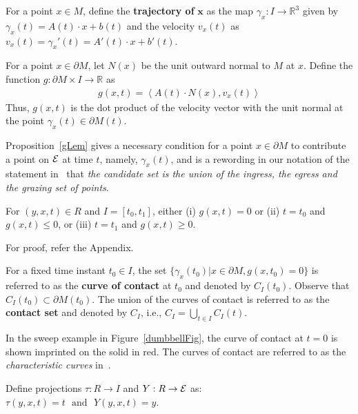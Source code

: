 \documentclass{elsart5p}
\begin{document}
\begin{defn} \label{trajXDef}
For a point $x \in M$, define the {\bf trajectory of} $\pmb{x}$ as the map $\gamma_x : I \to \mathbb{R}^3$ 
given by $\gamma_x(t) = A(t) \cdot x + b(t)$ and the velocity $v_x(t)$ as 
$v_x(t) = \gamma_x'(t) = A'(t) \cdot x + b'(t)$.
\end{defn}

For a point $x \in \partial M$, let $N(x)$ be the unit outward normal to $M$ at $x$.  Define the function 
$g: \partial M \times I \to \mathbb{R}$ as 
\begin{align} \label{gEq}
g(x, t) = \left < A(t) \cdot N(x) , v_x(t) \right >
\end{align} 
Thus, $g(x, t)$ is the dot product of the velocity vector with the unit normal at the point $\gamma_x(t) \in \partial M(t)$.


Proposition~\ref{gLem} gives a necessary condition for a point $x \in \partial M$ to 
contribute a point on ${\cal E}$ at time $t$, namely, $\gamma_x(t)$, 
and is a rewording in our notation of the statement in~\cite{sede} that 
{\em the candidate set is the union of the ingress, the egress and the 
grazing set of points}.

\begin{prop} \label{gLem}
For $(y, x, t) \in R$ and $I = [t_0, t_1]$, either 
(i) $g(x,t) = 0$ or 
(ii) $t = t_0$ and $g(x,t) \leq 0$, or 
(iii) $t = t_1$ and $g(x,t) \geq 0$.
\end{prop}
For proof, refer the Appendix.
\begin{defn} \label{cocDef}
For a fixed time instant $t_0 \in I$, the set $\{ \gamma_x(t_0)| x \in \partial M, g(x,t_0) = 0 \}$ is
referred to as the {\bf curve of contact} at $t_0$ and denoted by $C_I(t_0)$. 
Observe that $C_I(t_0) \subset \partial M(t_0)$. The union of the 
curves of contact is referred to as the {\bf contact set} and denoted by $C_I$, i.e., 
$C_I = \displaystyle \bigcup_{t \in I} C_I(t)$.
\end{defn}

In the sweep example in Figure~\ref{dumbbellFig}, the curve of contact at $t=0$ is shown imprinted 
on the solid in red. The curves of contact are referred to as the 
{\em characteristic curves} in~\cite{peternell}.


\begin{defn} \label{projDef}
Define projections $\tau: R \to I$ 
and $Y: R \to {\cal E}$ as:
$\tau(y,x,t) = t \mbox{~~and~~} Y(y,x,t) = y$.
\end{defn}
\end{document}
